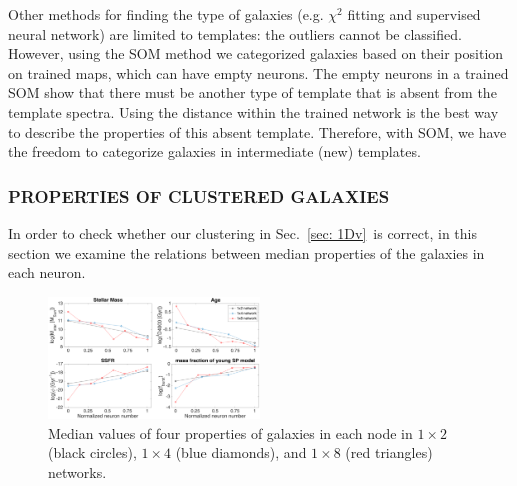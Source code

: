             Other methods for finding the type of galaxies (e.g. $\chi^2$ fitting and supervised neural network) are limited to templates: the outliers cannot be classified.
            However, using the SOM method we categorized galaxies based on their position on trained maps, which can have empty neurons.
            The empty neurons in a trained SOM show that there must be another type of template that is absent from the  template spectra.
            Using the distance within the trained network is the best way to describe the properties of this absent template.
            Therefore, with SOM, we have the freedom to categorize galaxies in intermediate (new) templates.
            

                        
        
        
        \subsubsection{PROPERTIES OF CLUSTERED GALAXIES}
        
        In order to check whether our clustering in Sec.~\ref{sec: 1Dv}~is correct, in this section we examine the relations between median properties of the galaxies in each neuron.  %
        
        \begin{figure}
            \centering
            \includegraphics[width=0.5\textwidth]{images0.01/1d/props5.png}
            \caption{Median values of four properties of galaxies in each node in $1\times2$ (black circles), $1\times4$ (blue diamonds), and $1\times8$ (red triangles) networks.}
            \label{fig: props}
        \end{figure}
       
